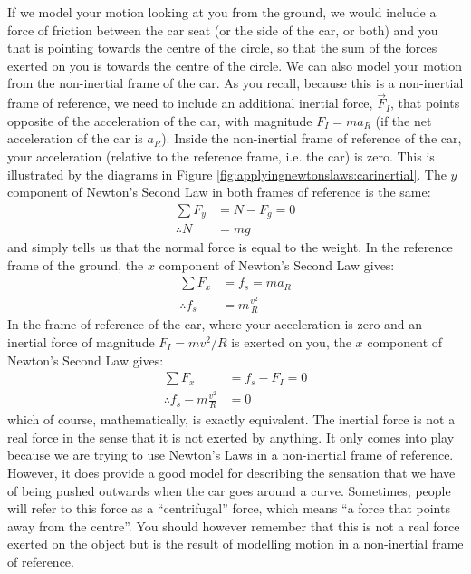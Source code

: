 If we model your motion looking at you from the ground, we would include a force of friction between the car seat (or the side of the car, or both) and you that is pointing towards the centre of the circle, so that the sum of the forces exerted on you is towards the centre of the circle. We can also model your motion from the non-inertial frame of the car. As you recall, because this is a non-inertial frame of reference, we need to include an additional inertial force, $\vec F_I$, that points opposite of the acceleration of the car, with magnitude $F_I=ma_R$ (if the net acceleration of the car is $a_R$). Inside the non-inertial frame of reference of the car, your acceleration (relative to the reference frame, i.e. the car) is zero. This is illustrated by the diagrams in Figure \ref{fig:applyingnewtonslaws:carinertial}.
The $y$ component of Newton's Second Law in both frames of reference is the same:
\begin{align*}
\sum F_y&=N-F_g=0\\
\therefore N&=mg
\end{align*}
and simply tells us that the normal force is equal to the weight. In the reference frame of the ground, the $x$ component of Newton's Second Law gives:
\begin{align*}
\sum F_x &= f_s = ma_R\\
\therefore f_s &= m\frac{v^2}{R}
\end{align*}
In the frame of reference of the car, where your acceleration is zero and an inertial force of magnitude $F_I=mv^2/R$ is exerted on you, the $x$ component of Newton's Second Law gives:
\begin{align*}
\sum F_x &= f_s-F_I = 0\\
\therefore f_s - m\frac{v^2}{R} &= 0
\end{align*}
which of course, mathematically, is exactly equivalent. The inertial force is not a real force in the sense that it is not exerted by anything. It only comes into play because we are trying to use Newton's Laws in a non-inertial frame of reference. However, it does provide a good model for describing the sensation that we have of being pushed outwards when the car goes around a curve. Sometimes, people will refer to this force as a ``centrifugal'' force, which means ``a force that points away from the centre''. You should however remember that this is not a real force exerted on the object but is the result of modelling motion in a non-inertial frame of reference.

